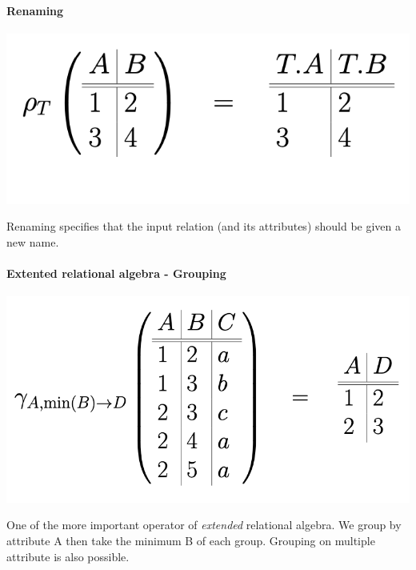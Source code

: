 \documentclass[12pt,a4paper]{article}
\begin{document}
\paragraph{Renaming}
 \begin{center}
	\includegraphics[scale=0.45]{img/img12.png}
\end{center}
Renaming specifies that the input relation (and its attributes) should be given a new name.

\paragraph{Extented relational algebra - Grouping}
\begin{center}
	\includegraphics[scale=0.45]{img/img13.png}
\end{center}
One of the more important operator of \emph{extended} relational algebra. We group by attribute A then take the minimum B of each group. Grouping on multiple attribute is also possible.
\end{document}
